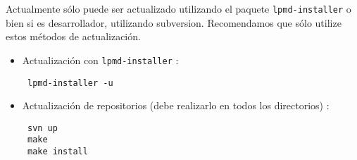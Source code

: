  Actualmente {\lpmd} s\'olo puede ser actualizado utilizando el paquete \verb|lpmd-installer| o bien si es desarrollador, utilizando subversion. Recomendamos que s\'olo utilize estos m\'etodos de actualizaci\'on.

\begin{itemize}
 \item Actualizaci\'on con \verb|lpmd-installer| :
 \begin{verbatim}
 lpmd-installer -u
 \end{verbatim}
 \item Actualizaci\'on de repositorios (debe realizarlo en todos los directorios) :
 \begin{verbatim}
 svn up
 make
 make install
 \end{verbatim}
\end{itemize}

